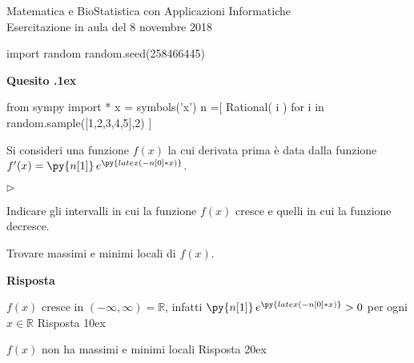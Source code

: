 \documentclass[11pt,twoside,a4paper]{article}
\newcommand{\mylabel}[1]{#1\hfill}
\renewenvironment{itemize}
  {\begin{list}{$\triangleright$}{%
   \setlength{\parskip}{0mm}
   \setlength{\topsep}{.4\baselineskip}
   \setlength{\rightmargin}{0mm}
   \setlength{\listparindent}{0mm}
   \setlength{\itemindent}{0mm}
   \setlength{\labelwidth}{2ex}
   \setlength{\itemsep}{.4\baselineskip}
   \setlength{\parsep}{0mm}
   \setlength{\partopsep}{0mm}
   \setlength{\labelsep}{1ex}
   \setlength{\leftmargin}{\labelwidth+\labelsep}
   \let\makelabel\mylabel}}{%
   \end{list}\vspace*{-1.3mm}}
\newcounter{quesito}
\newenvironment{question}{\addtocounter{quesito}{1}\par\textbf{Quesito \thequesito.\kern1ex}}{\vspace{0.5\parskip}}
\newenvironment{answer}{\par\textbf{Risposta\quad}}{\vspace{\parskip}}
\begin{document}
\colorbox{blue!10}{\begin{minipage}{\textwidth}
Matematica e BioStatistica con Applicazioni Informatiche\\
Esercitazione in aula del 8 novembre 2018
\end{minipage}}

\begin{pycode}
import random
random.seed(258466445)
\end{pycode}
\bigskip
\begin{question}
\def\RR{{\mathds R}}
\begin{pycode}
from sympy import *
x = symbols('x')
n =[ Rational( i ) for i in random.sample([1,2,3,4,5],2) ]
\end{pycode}
Si consideri una funzione $f(x)$ la cui derivata prima è data dalla funzione $f'(x) = \py{n[1]}\,  e^{\py{latex(-n[0]*x)}}$.\nobreak
\begin{itemize}
\item[1.] Indicare gli intervalli in cui la funzione $f(x)$ cresce e quelli in cui la funzione decresce.
\item[2.] Trovare massimi e minimi locali di $f(x)$.
\end{itemize}
\begin{answer}

{\color{blue}
$f(x)$ cresce in $(-\infty, \infty) = \RR$}, infatti $\py{n[1]}\, e^{\py{latex(-n[0]*x)}} > 0$ per ogni $x \in \RR$
{\color{blue}
\hfill Risposta 1\kern0ex}

{\color{blue}
$f(x)$ non ha massimi e minimi locali
\hfill Risposta 2\kern0ex}

\end{answer}
\end{question}
\end{document}
